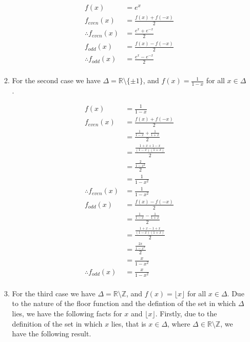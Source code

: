 \documentclass[a4paper]{article}
\begin{document}
\begin{enumerate}[label=\textbf{\arabic*.}]
\begin{enumerate}
		\begin{align*}
		f(x) & = e^x\\
		f_{even}(x) & = \frac{f(x) + f(-x)}{2}\\
		\therefore f_{even}(x) & = \frac{e^x + e^{-x}}{2}\\
		f_{odd}(x) & = \frac{f(x) - f(-x)}{2}\\
		\therefore f_{odd}(x) & = \frac{e^x - e^{-x}}{2}\\
		\end{align*}

		\pagebreak

		\item For the second case we have $\displaystyle{\Delta = \mathbb{R}\setminus \{\pm 1\}}$, and $\displaystyle{f(x)=\frac{1}{1-x}}$ for all $\displaystyle{x \in \Delta}$.

		\begin{align*}
		f(x) & = \frac{1}{1-x}\\
		f_{even}(x) & = \frac{f(x) + f(-x)}{2}\\
		& = \frac{\frac{1}{1-x} + \frac{1}{1+x}}{2}\\
		& = \frac{\frac{1+x+1-x}{(1-x)(1+x)}}{2}\\
		& = \frac{\frac{2}{1-x^2}}{2}\\
		& = \frac{1}{1-x^2}\\
		\therefore f_{even}(x) & = \frac{1}{1-x^2}\\
		f_{odd}(x) & = \frac{f(x) - f(-x)}{2}\\
		& = \frac{\frac{1}{1-x} - \frac{1}{1+x}}{2}\\
		& = \frac{\frac{1+x-1+x}{(1-x)(1+x)}}{2}\\
		& = \frac{\frac{2x}{1-x^2}}{2}\\
		& = \frac{x}{1-x^2}\\
		\therefore f_{odd}(x) & = \frac{x}{1-x^2}\\
		\end{align*}

		\pagebreak

		\item For the third case we have $\displaystyle{\Delta = \mathbb{R} \setminus \mathbb{Z}}$, and $\displaystyle{f(x) = \lfloor{x}\rfloor}$ for all $\displaystyle{x \in \Delta}$. Due to the nature of the floor function and the defintion of the set in which $\displaystyle{\Delta}$ lies, we have the following facts for $\displaystyle{x}$ and $\displaystyle{\lfloor{x}\rfloor}$. Firstly, due to the definition of the set in which $\displaystyle{x}$ lies, that is $\displaystyle{x \in \Delta}$, where $\displaystyle{\Delta \in \mathbb{R} \setminus \mathbb{Z}}$, we have the following result.


\end{enumerate}
\end{enumerate}
\end{document}

